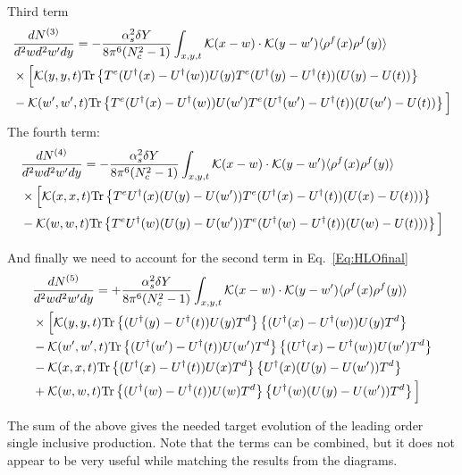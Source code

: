 \documentclass[aps,prd,amsmath,amssymb,nofootinbib]{revtex4-2}
\numberwithin{equation}{section}
\begin{document}
Third term 
\begin{align}
    &\frac{dN^{(3)}}{d^2 w d^2 w' d y} = - \frac{\alpha_s^2 \delta Y}{8 \pi^6 (N_c^2-1)}
\int_{x,y,t} {\cal K}(x-w)\cdot {\cal K}(y-w') \langle\rho^f(x) \rho^f(y) \rangle \notag \\ & \times  
\Big[ 
 {\cal K}(y,y,t) {\rm Tr} \left\{ T^e (U^\dagger(x) - U^\dagger(w)) U(y) T^e ( U^\dagger(y) - U^\dagger(t) )  ( U(y) - U(t) )\right\}
 \notag \\ & -  {\cal K}(w', w',t) {\rm Tr} \left\{ T^e (U^\dagger(x) - U^\dagger(w)) U(w') T^e ( U^\dagger(w') - U^\dagger(t) )  ( U(w') - U(t) )\right\}
\Big] 
\end{align} 
The fourth term:
\begin{align}
    &\frac{dN^{(4)}}{d^2 w d^2 w' d y} = - \frac{\alpha_s^2 \delta Y}{8 \pi^6 (N_c^2-1)}
\int_{x,y,t} {\cal K}(x-w)\cdot {\cal K}(y-w') \langle\rho^f(x) \rho^f(y) \rangle \notag \\ & \times  
\Big[ 
 {\cal K}(x,x,t) {\rm Tr} \left\{ T^e U^\dagger(x) ( U(y) - U(w') ) T^e ( U^\dagger(x) - U^\dagger(t) )  ( U(x) - U(t) ) )\right\}
 \notag \\ & -  {\cal K}(w, w,t) {\rm Tr} \left\{ T^e U^\dagger(w) ( U(y) - U(w') )  T^e ( U^\dagger(w) - U^\dagger(t) )  ( U(w) - U(t) ) )\right\}
\Big] 
\end{align} 


And finally we need to account for the second term in Eq.~\eqref{Eq:HLOfinal} 
\begin{align}
    &\frac{dN^{(5)}}{d^2 w d^2 w' d y} =  +\frac{\alpha_s^2 \delta Y}{8 \pi^6 (N_c^2-1)}
\int_{x,y,t} {\cal K}(x-w)\cdot {\cal K}(y-w') \langle\rho^f(x) \rho^f(y) \rangle \notag \\ & \times  
\Big[ 
 {\cal K}(y,y,t) {\rm Tr} \left\{ (U^\dagger(y) -U^\dagger(t) ) U(y) T^d \right\} \left\{ (U^\dagger(x) -U^\dagger(w) ) U(y) T^d \right\} \notag \\ &
 -  {\cal K}(w',w',t) {\rm Tr} \left\{ (U^\dagger(w') -U^\dagger(t) ) U(w') T^d \right\} \left\{ (U^\dagger(x) -U^\dagger(w) ) U(w') T^d \right\}
\notag \\ &
 -  {\cal K}(x,x,t) {\rm Tr} \left\{ (U^\dagger(x) -U^\dagger(t) ) U(x) T^d \right\} 
 \left\{ U^\dagger(x)  (U(y) - U(w')) T^d \right\}
\notag \\ & 
+ {\cal K}(w,w,t) {\rm Tr} \left\{ (U^\dagger(w) -U^\dagger(t) ) U(w) T^d \right\} 
 \left\{ U^\dagger(w)  (U(y) - U(w')) T^d \right\}
\Big] 
\end{align} 


The sum of the above gives the needed target evolution of the leading order single inclusive production. 
Note that the terms can be combined, but it does not appear to be very useful while matching the results from the diagrams.
\end{document}
